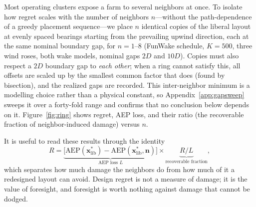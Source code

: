 \documentclass[wes, manuscript]{copernicus}
\begin{document}
Most operating clusters expose a farm to several neighbors at once.
To isolate how regret scales with the number of neighbors $n$---without the path-dependence of a greedy placement sequence---we place $n$ identical copies of the liberal layout at evenly spaced bearings starting from the prevailing upwind direction, each at the same nominal boundary gap, for $n = 1$--$8$ (FunWake schedule, $K = 500$, three wind roses, both wake models, nominal gaps $2D$ and $10D$).
Copies must also respect a $2D$ boundary gap to \emph{each other}; when a ring cannot satisfy this, all offsets are scaled up by the smallest common factor that does (found by bisection), and the realized gaps are recorded.
This inter-neighbor minimum is a modelling choice rather than a physical constant, so Appendix~\ref{app:gapsweep} sweeps it over a forty-fold range and confirms that no conclusion below depends on it.
Figure~\ref{fig:ring} shows regret, AEP loss, and their ratio (the recoverable fraction of neighbor-induced damage) versus $n$.

It is useful to read these results through the identity
\begin{equation}\label{eq:decomp}
    R = \underbrace{\bigl[\text{AEP}(\mathbf{x}^*_\text{lib}) - \text{AEP}(\mathbf{x}^*_\text{lib}, \mathbf{n})\bigr]}_{\text{AEP loss } L} \times \underbrace{R/L}_{\text{recoverable fraction}},
\end{equation}
which separates how much damage the neighbors do from how much of it a redesigned layout can avoid.
Design regret is not a measure of damage; it is the value of foresight, and foresight is worth nothing against damage that cannot be dodged.
\end{document}
